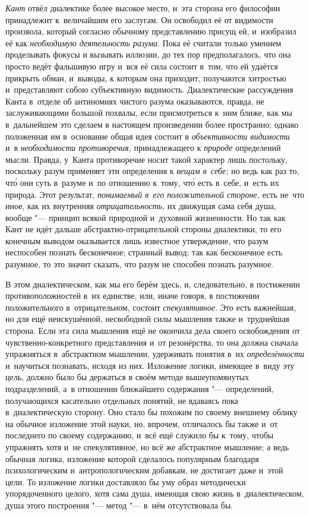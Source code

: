 {\em Кант} отвёл диалектике более высокое место, и~эта
сторона его философии принадлежит к~величайшим его заслугам. Он освободил
её от видимости произвола, который согласно обычному представлению присущ
ей, и~изобразил её как {\em необходимую деятельность разума}.
Пока её считали только умением проделывать фокусы и
вызывать иллюзии, до тех пор предполагалось, что она просто ведёт фальшивую
игру и~вся её сила состоит в~том, что ей удаётся прикрыть обман, и~выводы,
к которым она приходит, получаются хитростью и~представляют собою
субъективную видимость. Диалектические рассуждения Канта в~отделе об
антиномиях чистого разума оказываются, правда, не заслуживающими большой
похвалы, если присмотреться к~ним ближе, как мы в~дальнейшем это сделаем в
настоящем произведении более пространно; однако положенная им в~основание
общая идея состоит в {\em объективности видимости} и~в
{\em необходимости противоречия,} принадлежащего к {\em природе}
определений мысли.
Правда, у~Канта противоречие носит такой характер лишь постольку, поскольку
разум применяет эти определения к {\em вещам в~себе;}
но ведь как раз то, чт\'{о} они суть в~разуме и~по отношению к~тому,
чт\'{о} есть в~себе, и~есть их природа. Этот результат,
{\em понимаемый в~его положительной стороне,} есть не~что иное,
как их внутренняя {\em отрицательность,} их
движущая сама себя душа, вообще "--- принцип всякой природной и~духовной
жизненности. Но так как Кант не идёт дальше абстрактно-отрицательной
стороны диалектики, то его конечным выводом оказывается лишь известное
утверждение, что разум неспособен познать бесконечное; странный вывод: так
как бесконечное есть разумное, то это значит сказать, что разум не способен
познать разумное.

В этом диалектическом, как мы его берём здесь, и, следовательно, в
постижении противоположностей в~их единстве, или, иначе говоря, в
постижении положительного в~отрицательном, состоит
{\em спекулятивное}. Это есть важнейшая, но для ещё
неискушённой, несвободной силы мышления также и~труднейшая сторона. Если
эта сила мышления ещё не окончила дела своего освобождения от
чувственно-конкретного представления и~от резонёрства, то она должна
сначала упражняться в~абстрактном мышлении, удерживать понятия в~их
{\em определённости} и~научиться познавать, исходя из
них. Изложение логики, имеющее в~виду эту цель, должно было бы держаться в
своём методе вышеупомянутых подразделений, а~в отношении ближайшего
содержания "--- определений, получающихся касательно отдельных понятий, не
вдаваясь пока в~диалектическую сторону. Оно стало бы похожим по своему
внешнему облику на обычное изложение этой науки, но, впрочем, отличалось бы
также и~от последнего по своему содержанию, и~всё ещё служило бы к~тому,
чтобы упражнять хотя и~не спекулятивное, но всё же абстрактное мышление; а
ведь обычная логика, изложение которой сделалось популярным благодаря
психологическим и~антропологическим добавкам, не достигает даже и~этой
цели. То изложение логики доставляло бы уму образ методически
упорядоченного целого, хотя сама душа, имеющая свою жизнь в~диалектическом,
душа этого построения "--- метод "--- в~нём отсутствовала бы.

